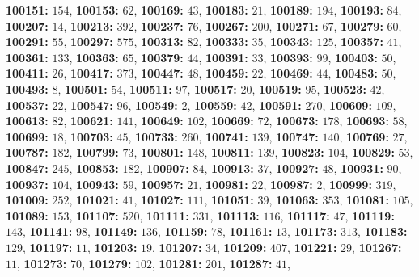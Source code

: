 \textsf{\bfseries 100151:} $154$, \textsf{\bfseries 100153:} $62$, \textsf{\bfseries 100169:} $43$, \textsf{\bfseries 100183:} $21$, \textsf{\bfseries 100189:} $194$, \textsf{\bfseries 100193:} $84$, \textsf{\bfseries 100207:} $14$, \textsf{\bfseries 100213:} $392$, \textsf{\bfseries 100237:} $76$, \textsf{\bfseries 100267:} $200$, \textsf{\bfseries 100271:} $67$, \textsf{\bfseries 100279:} $60$, \textsf{\bfseries 100291:} $55$, \textsf{\bfseries 100297:} $575$, \textsf{\bfseries 100313:} $82$, \textsf{\bfseries 100333:} $35$, \textsf{\bfseries 100343:} $125$, \textsf{\bfseries 100357:} $41$, \textsf{\bfseries 100361:} $133$, \textsf{\bfseries 100363:} $65$, \textsf{\bfseries 100379:} $44$, \textsf{\bfseries 100391:} $33$, \textsf{\bfseries 100393:} $99$, \textsf{\bfseries 100403:} $50$, \textsf{\bfseries 100411:} $26$, \textsf{\bfseries 100417:} $373$, \textsf{\bfseries 100447:} $48$, \textsf{\bfseries 100459:} $22$, \textsf{\bfseries 100469:} $44$, \textsf{\bfseries 100483:} $50$, \textsf{\bfseries 100493:} $8$, \textsf{\bfseries 100501:} $54$, \textsf{\bfseries 100511:} $97$, \textsf{\bfseries 100517:} $20$, \textsf{\bfseries 100519:} $95$, \textsf{\bfseries 100523:} $42$, \textsf{\bfseries 100537:} $22$, \textsf{\bfseries 100547:} $96$, \textsf{\bfseries 100549:} $2$, \textsf{\bfseries 100559:} $42$, \textsf{\bfseries 100591:} $270$, \textsf{\bfseries 100609:} $109$, \textsf{\bfseries 100613:} $82$, \textsf{\bfseries 100621:} $141$, \textsf{\bfseries 100649:} $102$, \textsf{\bfseries 100669:} $72$, \textsf{\bfseries 100673:} $178$, \textsf{\bfseries 100693:} $58$, \textsf{\bfseries 100699:} $18$, \textsf{\bfseries 100703:} $45$, \textsf{\bfseries 100733:} $260$, \textsf{\bfseries 100741:} $139$, \textsf{\bfseries 100747:} $140$, \textsf{\bfseries 100769:} $27$, \textsf{\bfseries 100787:} $182$, \textsf{\bfseries 100799:} $73$, \textsf{\bfseries 100801:} $148$, \textsf{\bfseries 100811:} $139$, \textsf{\bfseries 100823:} $104$, \textsf{\bfseries 100829:} $53$, \textsf{\bfseries 100847:} $245$, \textsf{\bfseries 100853:} $182$, \textsf{\bfseries 100907:} $84$, \textsf{\bfseries 100913:} $37$, \textsf{\bfseries 100927:} $48$, \textsf{\bfseries 100931:} $90$, \textsf{\bfseries 100937:} $104$, \textsf{\bfseries 100943:} $59$, \textsf{\bfseries 100957:} $21$, \textsf{\bfseries 100981:} $22$, \textsf{\bfseries 100987:} $2$, \textsf{\bfseries 100999:} $319$, \textsf{\bfseries 101009:} $252$, \textsf{\bfseries 101021:} $41$, \textsf{\bfseries 101027:} $111$, \textsf{\bfseries 101051:} $39$, \textsf{\bfseries 101063:} $353$, \textsf{\bfseries 101081:} $105$, \textsf{\bfseries 101089:} $153$, \textsf{\bfseries 101107:} $520$, \textsf{\bfseries 101111:} $331$, \textsf{\bfseries 101113:} $116$, \textsf{\bfseries 101117:} $47$, \textsf{\bfseries 101119:} $143$, \textsf{\bfseries 101141:} $98$, \textsf{\bfseries 101149:} $136$, \textsf{\bfseries 101159:} $78$, \textsf{\bfseries 101161:} $13$, \textsf{\bfseries 101173:} $313$, \textsf{\bfseries 101183:} $129$, \textsf{\bfseries 101197:} $11$, \textsf{\bfseries 101203:} $19$, \textsf{\bfseries 101207:} $34$, \textsf{\bfseries 101209:} $407$, \textsf{\bfseries 101221:} $29$, \textsf{\bfseries 101267:} $11$, \textsf{\bfseries 101273:} $70$, \textsf{\bfseries 101279:} $102$, \textsf{\bfseries 101281:} $201$, \textsf{\bfseries 101287:} $41$, 

